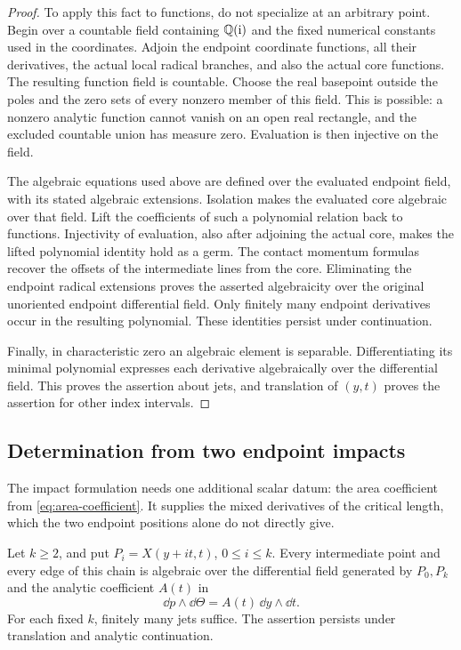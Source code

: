 \begin{proof}
To apply this fact to functions, do not specialize at an
arbitrary point.  Begin over a countable field containing
\(\mathbb Q(\mathrm i)\) and the fixed numerical constants used in
the coordinates.  Adjoin the endpoint coordinate
functions, all their derivatives, the actual local
radical branches, and also the actual core functions.
The resulting function field is countable.  Choose the
real basepoint outside the poles and the zero sets of
every nonzero member of this field.  This is possible:
a nonzero analytic function cannot vanish on an open
real rectangle, and the excluded countable union has
measure zero.  Evaluation is then injective on the
field.

The algebraic equations used above are defined over the
evaluated endpoint field, with its stated algebraic
extensions.  Isolation makes the evaluated core
algebraic over that field.  Lift the coefficients of
such a polynomial relation back to functions.
Injectivity of evaluation, also after adjoining the
actual core, makes the lifted polynomial identity
hold as a germ.  The contact momentum formulas recover
the offsets of the intermediate lines from the core.
Eliminating the endpoint radical extensions proves the
asserted algebraicity over the original unoriented
endpoint differential field.  Only finitely many
endpoint derivatives occur in the resulting polynomial.
These identities persist under continuation.

Finally, in characteristic zero an algebraic element is
separable.  Differentiating its minimal polynomial
expresses each derivative algebraically over the
differential field.  This proves the assertion about
jets, and translation of \((y,t)\) proves the assertion
for other index intervals.
\end{proof}

\subsection{Determination from two endpoint impacts}

The impact formulation needs one additional scalar datum: the
area coefficient from \eqref{eq:area-coefficient}.  It supplies
the mixed derivatives of the critical length, which the two
endpoint positions alone do not directly give.

\begin{theorem}
\label{thm:lens-points}
Let \(k\ge2\), and put \(P_i=X(y+it,t)\), \(0\le i\le k\).
Every intermediate point and every edge of this chain is
algebraic over the differential field generated by \(P_0,P_k\)
and the analytic coefficient \(A(t)\) in
\[
 \dd p\wedge\dd\Theta=A(t)\,\dd y\wedge\dd t.
\]
For each fixed \(k\), finitely many jets suffice.  The assertion
persists under translation and analytic continuation.
\end{theorem}

